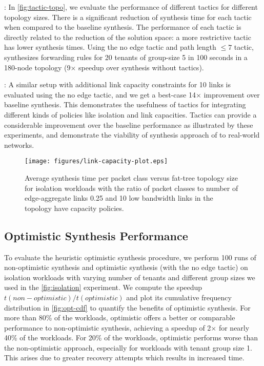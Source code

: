 : 
In \cref{fig:tactic-topo},
 we evaluate the performance of different tactics for different topology sizes. There is a
 significant reduction of synthesis time for each tactic when compared to the baseline synthesis.
 The performance of each tactic is directly related to the reduction of the solution space: a more
 restrictive tactic has lower synthesis times. 
  Using the no edge tactic
 and path length $\leq 7$ tactic, \Name synthesizes forwarding rules for 20 tenants of group-size 5 in 100 seconds in a 180-node
 topology (9$\times$ speedup over synthesis without tactics).
  
 : A similar setup
 with additional link capacity constraints for 10 links is evaluated
 using the no edge tactic, and we get a best-case 14$\times$
 improvement over baseline synthesis. This demonstrates the usefulness
 of tactics for integrating different kinds of policies like isolation
 and link capacities.  Tactics can provide a considerable improvement
 over the baseline performance as illustrated by these experiments,
 and demonstrate the viability of synthesis approach of \Name to
 real-world networks.
 
\begin{figure}[h]
	\texttt{[image: figures/link-capacity-plot.eps]}
	\caption{Average synthesis time per packet class versus fat-tree topology size for isolation workloads 
		with the ratio of packet classes to number of edge-aggregate links 0.25 and 10 low bandwidth links in the topology 
		have capacity policies.}
	\label{fig:link-capacity}
\end{figure}


\subsection{Optimistic Synthesis
  Performance} \label{sec:optimisticeval} To evaluate the heuristic
optimistic synthesis procedure, we perform 100 runs of non-optimistic
synthesis and optimistic synthesis (with the no edge tactic) on
isolation workloads with varying number of tenants and different group
sizes we used in the \cref{fig:isolation} experiment. We compute the
speedup $t(non-optimistic)/t(optimistic)$ and plot its cumulative
frequency distribution in \cref{fig:opt-cdf} to quantify the benefits
of optimistic synthesis. For more than 80\% of the workloads,
optimistic offers a better or comparable performance to non-optimistic
synthesis, achieving a speedup of 2$\times$ for nearly 40\% of the
workloads. For 20\% of the workloads, optimistic performs worse than
the non-optimistic approach, especially for workloads with tenant
group size 1.  This arises due to greater recovery attempts which
results in increased time.

